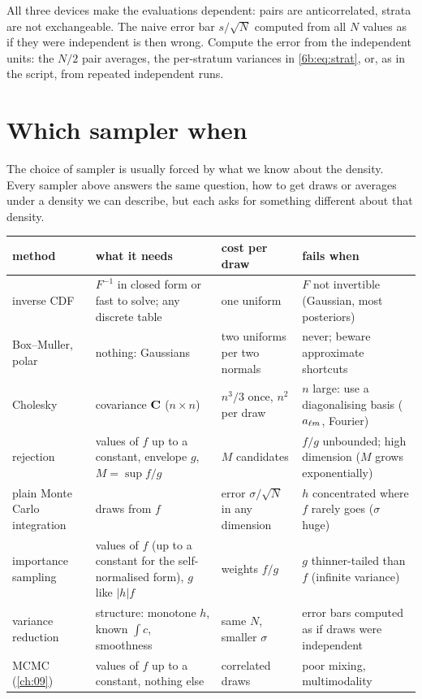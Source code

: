 \begin{pitfall}
All three devices make the evaluations dependent: pairs are anticorrelated, strata are not
exchangeable. The naive error bar $s/\sqrt N$ computed from all $N$ values as if they were
independent is then wrong. Compute the error from the independent units: the $N/2$ pair
averages, the per-stratum variances in \eqref{6b:eq:strat}, or, as in the script, from repeated
independent runs.
\end{pitfall}

\section{Which sampler when}
\label{6b:sec:which}

The choice of sampler is usually forced by what we know about the density. Every sampler
above answers the same question, how to get draws or averages under a density we can
describe, but each asks for something different about that density.

\begin{taxonomy}
\small
\renewcommand{\arraystretch}{1.15}
\begin{tabularx}{\linewidth}{@{}>{\raggedright\arraybackslash}p{2.3cm}
                               >{\raggedright\arraybackslash}X
                               >{\raggedright\arraybackslash}p{2.6cm}
                               >{\raggedright\arraybackslash}p{2.9cm}@{}}
\toprule
method & what it needs & cost per draw & fails when\\\midrule
inverse CDF & $F^{-1}$ in closed form or fast to solve; any discrete table & one uniform & $F$ not invertible (Gaussian, most posteriors)\\
Box--Muller, polar & nothing: Gaussians & two uniforms per two normals & never; beware approximate shortcuts\\
Cholesky & covariance $\mathbf{C}$ ($n\times n$) & $n^3/3$ once, $n^2$ per draw & $n$ large: use a diagonalising basis ($a_{\ell m}$, Fourier)\\
rejection & values of $f$ up to a constant, envelope $g$, $M=\sup f/g$ & $M$ candidates & $f/g$ unbounded; high dimension ($M$ grows exponentially)\\
plain Monte Carlo integration & draws from $f$ & error $\sigma/\sqrt N$ in any dimension & $h$ concentrated where $f$ rarely goes ($\sigma$ huge)\\
importance sampling & values of $f$ (up to a constant for the self-normalised form), $g$ like $\lvert h\rvert f$ & weights $f/g$ & $g$ thinner-tailed than $f$ (infinite variance)\\
variance reduction & structure: monotone $h$, known $\int c$, smoothness & same $N$, smaller $\sigma$ & error bars computed as if draws were independent\\
MCMC (\cref{ch:09}) & values of $f$ up to a constant, nothing else & correlated draws & poor mixing, multimodality\\
\bottomrule
\end{tabularx}
\end{taxonomy}


